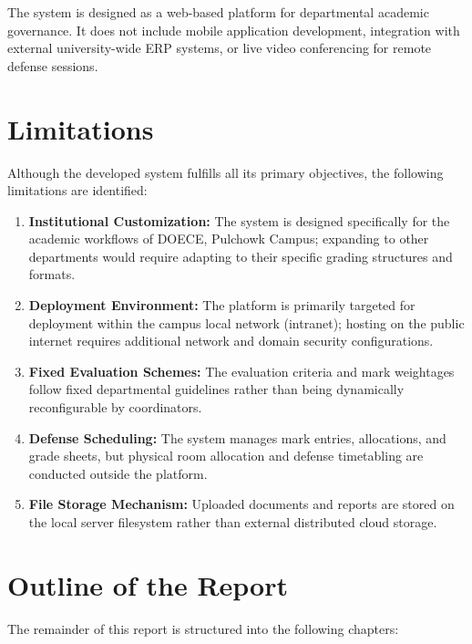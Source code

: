 The system is designed as a web-based platform for departmental academic governance. It does not include mobile application development, integration with external university-wide ERP systems, or live video conferencing for remote defense sessions.

\section{Limitations}
Although the developed system fulfills all its primary objectives, the following limitations are identified:

\begin{enumerate}
  \item \textbf{Institutional Customization:} The system is designed specifically for the academic workflows of DOECE, Pulchowk Campus; expanding to other departments would require adapting to their specific grading structures and formats.
  
  \item \textbf{Deployment Environment:} The platform is primarily targeted for deployment within the campus local network (intranet); hosting on the public internet requires additional network and domain security configurations.
  
  \item \textbf{Fixed Evaluation Schemes:} The evaluation criteria and mark weightages follow fixed departmental guidelines rather than being dynamically reconfigurable by coordinators.
  
  \item \textbf{Defense Scheduling:} The system manages mark entries, allocations, and grade sheets, but physical room allocation and defense timetabling are conducted outside the platform.
  
  \item \textbf{File Storage Mechanism:} Uploaded documents and reports are stored on the local server filesystem rather than external distributed cloud storage.
\end{enumerate}

\section{Outline of the Report}
The remainder of this report is structured into the following chapters:

